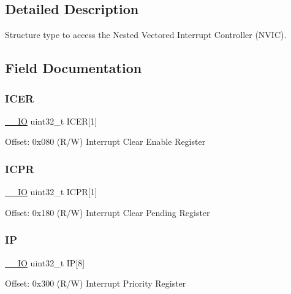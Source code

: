 \subsection{Detailed Description}
Structure type to access the Nested Vectored Interrupt Controller (N\+V\+IC). 

\subsection{Field Documentation}
\mbox{\label{struct_n_v_i_c___type_a36b661a339cab43484a412776b3840d7}} 
\subsubsection{\texorpdfstring{ICER}{ICER}}
{\footnotesize\ttfamily \mbox{\hyperlink{core__cm0plus_8h_aec43007d9998a0a0e01faede4133d6be}{\+\_\+\+\_\+\+IO}} uint32\+\_\+t I\+C\+ER\mbox{[}1\mbox{]}}

Offset\+: 0x080 (R/W) Interrupt Clear Enable Register \mbox{\label{struct_n_v_i_c___type_a193e3ea34c0cb880ced9f31c80320758}} 
\subsubsection{\texorpdfstring{ICPR}{ICPR}}
{\footnotesize\ttfamily \mbox{\hyperlink{core__cm0plus_8h_aec43007d9998a0a0e01faede4133d6be}{\+\_\+\+\_\+\+IO}} uint32\+\_\+t I\+C\+PR\mbox{[}1\mbox{]}}

Offset\+: 0x180 (R/W) Interrupt Clear Pending Register \mbox{\label{struct_n_v_i_c___type_aa09d96b0a7347a2df161495145a51a93}} 
\subsubsection{\texorpdfstring{IP}{IP}}
{\footnotesize\ttfamily \mbox{\hyperlink{core__cm0plus_8h_aec43007d9998a0a0e01faede4133d6be}{\+\_\+\+\_\+\+IO}} uint32\+\_\+t IP\mbox{[}8\mbox{]}}

Offset\+: 0x300 (R/W) Interrupt Priority Register \mbox{\label{struct_n_v_i_c___type_ab0e414637f38c9234818752145f0d1e6}} 
